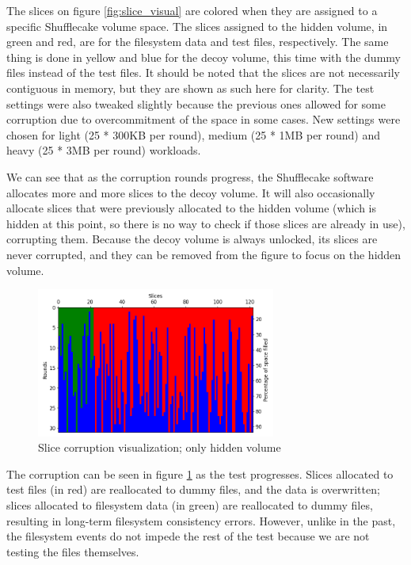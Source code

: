 \documentclass[a4paper,11pt,oneside]{report}
\begin{document}
The slices on figure \ref{fig:slice_visual} are colored when they are assigned to a specific Shufflecake volume space. The slices assigned to the hidden volume, in green and red, are for the filesystem data and test files, respectively. The same thing is done in yellow and blue for the decoy volume, this time with the dummy files instead of the test files. It should be noted that the slices are not necessarily contiguous in memory, but they are shown as such here for clarity. The test settings were also tweaked slightly because the previous ones allowed for some corruption due to overcommitment of the space in some cases. New settings were chosen for light (25 * 300KB per round), medium (25 * 1MB per round) and heavy (25 * 3MB per round) workloads.

We can see that as the corruption rounds progress, the Shufflecake software allocates more and more slices to the decoy volume. It will also occasionally allocate slices that were previously allocated to the hidden volume (which is hidden at this point, so there is no way to check if those slices are already in use), corrupting them. Because the decoy volume is always unlocked, its slices are never corrupted, and they can be removed from the figure to focus on the hidden volume.

\begin{figure}[ht]
\centering
\includegraphics[width=0.7\textwidth]{Figures/visual_slice_corruption_shorted.png}
\caption{Slice corruption visualization; only hidden volume}
\label{fig:slice_visual_shorted}
\end{figure}

The corruption can be seen in figure \ref{fig:slice_visual_shorted} as the test progresses. Slices allocated to test files (in red) are reallocated to dummy files, and the data is overwritten; slices allocated to filesystem data (in green) are reallocated to dummy files, resulting in long-term filesystem consistency errors. However, unlike in the past, the filesystem events do not impede the rest of the test because we are not testing the files themselves.
\end{document}
